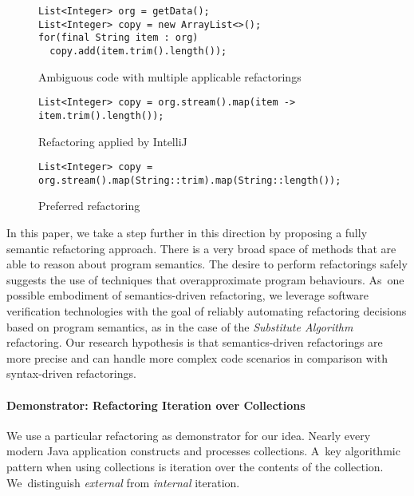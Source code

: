 \documentclass[runningheads,a4paper]{llncs}
\begin{document}
\begin{figure}
\begin{lstlisting}[mathescape=true,showstringspaces=false]
List<Integer> org = getData();
List<Integer> copy = new ArrayList<>();
for(final String item : org)
  copy.add(item.trim().length());
\end{lstlisting}
\caption{Ambiguous code with multiple applicable refactorings}
\label{ex:syntax-limits-ambiguous}
\end{figure}

\begin{figure}
\begin{lstlisting}[mathescape=true,showstringspaces=false]
List<Integer> copy = org.stream().map(item -> item.trim().length());
\end{lstlisting}
\caption{Refactoring applied by IntelliJ}
\label{ex:syntax-limits-intellij}
\end{figure}

\begin{figure}
\begin{lstlisting}[mathescape=true,showstringspaces=false]
List<Integer> copy = org.stream().map(String::trim).map(String::length());
\end{lstlisting}
\caption{Preferred refactoring}
\label{ex:syntax-limits-preferred}
\end{figure}

In this paper, we take a step further in this direction by proposing a
fully semantic refactoring approach.  There is a very broad space of
methods that are able to reason about program semantics.  The desire
to perform refactorings safely suggests the use of techniques that
overapproximate program behaviours.  As~one possible embodiment of
semantics-driven refactoring, we leverage software verification
technologies with the goal of reliably automating refactoring
decisions based on program semantics, as in the case of the {\em
  Substitute Algorithm} refactoring. Our research hypothesis is that
semantics-driven refactorings are more precise and can handle more
complex code scenarios in comparison with syntax-driven refactorings.

\paragraph{Demonstrator: Refactoring Iteration over Collections}

We use a particular refactoring as demonstrator for our idea. Nearly every
modern Java application constructs and processes collections.  A~key
algorithmic pattern when using collections is iteration over the contents of
the collection.  We~distinguish {\em external} from {\em
internal} iteration.
\end{document}
